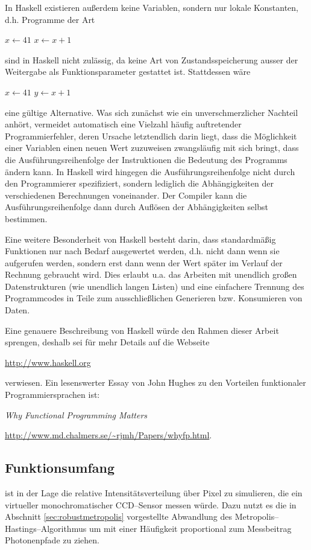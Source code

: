 	In Haskell existieren außerdem keine Variablen, sondern nur lokale Konstanten, d.h. Programme der Art
		\begin{algorithmic}
			\STATE $x\leftarrow 41$
			\STATE $x\leftarrow x+1$
		\end{algorithmic}
	sind in Haskell nicht zulässig, da keine Art von Zustandsspeicherung ausser der Weitergabe als Funktionsparameter gestattet ist. Stattdessen wäre
		\begin{algorithmic}
			\STATE $x\leftarrow 41$
			\STATE $y\leftarrow x+1$
		\end{algorithmic}
	eine gültige Alternative. Was sich zunächst wie ein unverschmerzlicher Nachteil anhört, vermeidet automatisch eine Vielzahl häufig auftretender Programmierfehler, deren Ursache letztendlich darin liegt, dass die Möglichkeit einer Variablen einen neuen Wert zuzuweisen zwangsläufig mit sich bringt, dass die Ausführungsreihenfolge der Instruktionen die Bedeutung des Programms ändern kann. In Haskell wird hingegen die Ausführungsreihenfolge nicht durch den Programmierer spezifiziert, sondern lediglich die Abhängigkeiten der verschiedenen Berechnungen voneinander. Der Compiler kann die Aus\-führ\-ungs\-rei\-hen\-fol\-ge dann durch Auflösen der Abhängigkeiten selbst bestimmen.
	
	Eine weitere Besonderheit von Haskell besteht darin, dass standardmäßig Funktionen nur nach Bedarf ausgewertet werden, d.h. nicht dann wenn sie aufgerufen werden, sondern erst dann wenn der Wert später im Verlauf der Rechnung gebraucht wird. Dies erlaubt u.a. das Arbeiten mit unendlich großen Datenstrukturen (wie unendlich langen Listen) und eine einfachere Trennung des  Programmcodes in Teile zum ausschließlichen Generieren bzw. Konsumieren von Daten.
		
	Eine genauere Beschreibung von Haskell würde den Rahmen dieser Arbeit sprengen, deshalb sei für mehr Details auf die Webseite
	
	\url{http://www.haskell.org}
	
	verwiesen. Ein lesenswerter Essay von John Hughes zu den Vorteilen funktionaler Programmiersprachen ist:
	
	{\em Why Functional Programming Matters}
	
	\url{http://www.md.chalmers.se/~rjmh/Papers/whyfp.html}.
	
	
	\subsection{Funktionsumfang}
	\pirate ist in der Lage die relative Intensitätsverteilung über Pixel zu simulieren, die ein virtueller monochromatischer CCD--Sensor messen würde. Dazu nutzt es die in Abschnitt \ref{sec:robustmetropolis} vorgestellte Abwandlung des Metropolis--Hastings--Algorithmus um mit einer Häufigkeit proportional zum Messbeitrag Photonenpfade zu ziehen.
	
